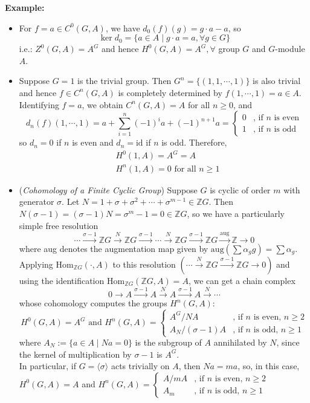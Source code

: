 \noindent\textbf{Example:} \begin{itemize}
    \item For $f=a \in C^0(G,A)$, we have $d_0 (f)(g)= g\cdot a-a$, so
    \[
    \ker d_0= \{a\in A\mid g\cdot a=a ,\forall g\in G\}
    \]
    i.e.: $Z^0(G,A)=A^G$ and hence $H^0(G,A)= A^G, \forall$ group $G$ and $G$-module $A$.

    \item Suppose $G=1$ is the trivial group. Then $G^n=\{(1,1,\cdots, 1)\}$ is also trivial and hence $f\in C^n(G,A)$ is completely determined by $f(1,\cdots,1)=a \in A$. Identifying $f=a$, we obtain $C^n(G,A)=A$ for all $n\geq 0$, and
    \[
    d_n(f) (1,\cdots, 1)= a+\sum_{i=1}^n (-1)^ia+ (-1)^{n+1} a=\begin{cases}
        0 &\text{, if }n \text{ is even}\\
        1 &\text{, if }n \text{ is odd}
    \end{cases}
    \]
    so $d_n=0$ if $n$ is even and $d_n=\text{id}$ if $n$ is odd. Therefore,
    \begin{align*}
        &H^0(1,A)=A^G=A\\
        &H^n(1,A)=0 \text{ for all } n\geq1
    \end{align*}

    \item (\textit{Cohomology of a Finite Cyclic Group}) Suppose $G$ is cyclic of order $m$ with generator $\sigma$. Let $N=1+ \sigma+ \sigma^2+ \cdots +\sigma^{m-1} \in \mathbb{Z}G$. Then $N(\sigma-1)= (\sigma-1)N= \sigma^m-1=0 \in \mathbb{Z}G$, so we have a particularly simple free resolution
    \[
    \cdots \xrightarrow{\sigma-1} \mathbb{Z}G \xrightarrow{N} \mathbb{Z}G \xrightarrow{\sigma-1} \cdots \xrightarrow{N} \mathbb{Z}G \xrightarrow{\sigma-1} \mathbb{Z}G \xrightarrow{\text{aug}} \mathbb{Z}\to0
    \]
    where aug denotes the augmentation map given by $\text{aug} (\sum \alpha_gg)= \sum \alpha_g$. Applying $\text{Hom}_{\mathbb{Z}G} (\cdot, A)$ to this resolution $(\cdots \xrightarrow{N} \mathbb{Z}G\xrightarrow{\sigma-1}\mathbb{Z}G\to0)$ and using the identification $\text{Hom}_{\mathbb{Z}G} (\mathbb{Z}G,A)=A$, we can get a chain complex
    \[
    0\to A\xrightarrow{\sigma-1} A\xrightarrow{N} A\xrightarrow{\sigma-1}A \xrightarrow{N} \cdots
    \]
    whose cohomology computes the groups $H^n(G,A)$:
    \[
    H^0(G,A)= A^G \text{ and } H^n(G,A)=\begin{cases}
        A^G/NA &\text{, if }n \text{ is even, } n\geq 2\\
        A_N/(\sigma-1)A &\text{, if }n \text{ is odd, } n\geq 1
    \end{cases}
    \]
    where $A_N:= \{a\in A\mid Na=0\}$ is the subgroup of $A$ annihilated by $N$, since the kernel of multiplication by $\sigma-1$ is $A^G$.\\
    In particular, if $G= \langle \sigma\rangle$ acts trivially on $A$, then $Na=ma$, so, in this case, $H^0(G,A)=A$ and $H^n (G,A)= \begin{cases}
        A/mA &\text{, if }n \text{ is even, } n\geq 2\\
        A_m &\text{, if }n \text{ is odd, } n\geq 1
    \end{cases}$
\end{itemize}

